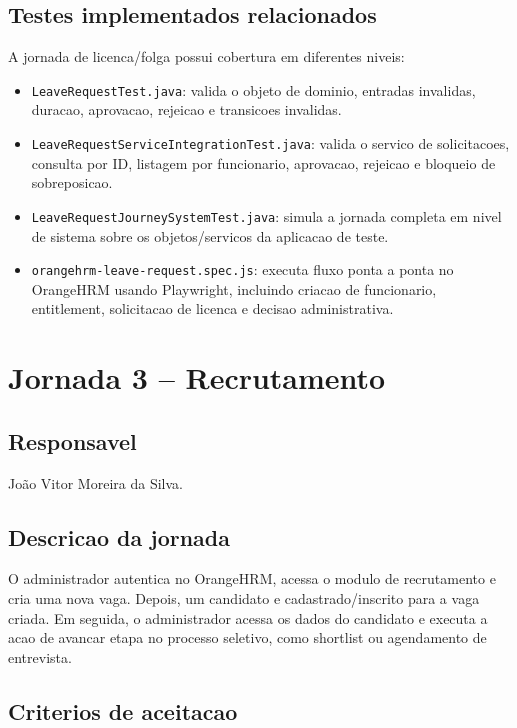 \documentclass[12pt,a4paper]{article}
\providecommand{\PessoaTres}{João Vitor Moreira da Silva}
\newcommand{\ClasseTeste}[1]{\texttt{#1}}
\begin{document}
\subsection{Testes implementados relacionados}

A jornada de licenca/folga possui cobertura em diferentes niveis:

\begin{itemize}
    \item \ClasseTeste{LeaveRequestTest.java}: valida o objeto de dominio, entradas invalidas, duracao, aprovacao, rejeicao e transicoes invalidas.
    \item \ClasseTeste{LeaveRequestServiceIntegrationTest.java}: valida o servico de solicitacoes, consulta por ID, listagem por funcionario, aprovacao, rejeicao e bloqueio de sobreposicao.
    \item \ClasseTeste{LeaveRequestJourneySystemTest.java}: simula a jornada completa em nivel de sistema sobre os objetos/servicos da aplicacao de teste.
    \item \ClasseTeste{orangehrm-leave-request.spec.js}: executa fluxo ponta a ponta no OrangeHRM usando Playwright, incluindo criacao de funcionario, entitlement, solicitacao de licenca e decisao administrativa.
\end{itemize}

\newpage
\section{Jornada 3 -- Recrutamento}

\subsection{Responsavel}

\PessoaTres.

\subsection{Descricao da jornada}

O administrador autentica no OrangeHRM, acessa o modulo de recrutamento e cria uma nova vaga. Depois, um candidato e cadastrado/inscrito para a vaga criada. Em seguida, o administrador acessa os dados do candidato e executa a acao de avancar etapa no processo seletivo, como shortlist ou agendamento de entrevista.

\subsection{Criterios de aceitacao}
\end{document}
